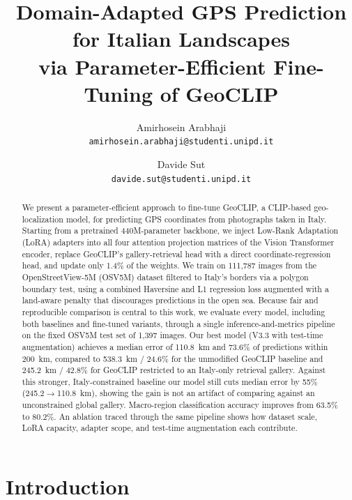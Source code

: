 \documentclass[10pt,twocolumn,letterpaper]{article}
\begin{document}
\title{Domain-Adapted GPS Prediction for Italian Landscapes\\
via Parameter-Efficient Fine-Tuning of GeoCLIP}

\author{Amirhosein Arabhaji\\
{\tt\small amirhosein.arabhaji@studenti.unipd.it}
\and
Davide Sut\\
{\tt\small davide.sut@studenti.unipd.it}
}

\maketitle

\begin{abstract}
We present a parameter-efficient approach to fine-tune
GeoCLIP, a CLIP-based geo-localization model,
for predicting GPS coordinates from photographs taken in Italy.
Starting from a pretrained 440M-parameter backbone, we inject Low-Rank
Adaptation (LoRA) adapters into all four attention projection
matrices of the Vision Transformer encoder, replace GeoCLIP's gallery-retrieval
head with a direct coordinate-regression head, and update only 1.4\% of the
weights.
We train on 111{,}787 images from the OpenStreetView-5M
(OSV5M) dataset filtered to Italy's borders via a polygon boundary
test, using a combined Haversine and L1 regression loss augmented with a land-aware penalty
that discourages predictions in the open sea.
Because fair and reproducible comparison is central to this work, we evaluate
every model, including both baselines and fine-tuned variants, through a single
inference-and-metrics pipeline on the fixed OSV5M test set of 1{,}397 images.
Our best model (V3.3 with test-time augmentation) achieves a median
error of 110.8~km and 73.6\% of predictions within 200~km, compared to
538.3~km / 24.6\% for the unmodified GeoCLIP baseline and 245.2~km / 42.8\% for
GeoCLIP restricted to an Italy-only retrieval gallery.
Against this stronger, Italy-constrained baseline our model still cuts median
error by 55\% (245.2$\to$110.8~km), showing the gain is not an artifact of
comparing against an unconstrained global gallery.
Macro-region classification accuracy improves from 63.5\% to 80.2\%.
An ablation traced through the same pipeline shows how dataset scale, LoRA
capacity, adapter scope, and test-time augmentation each contribute.
\end{abstract}

\section{Introduction}
\end{document}

